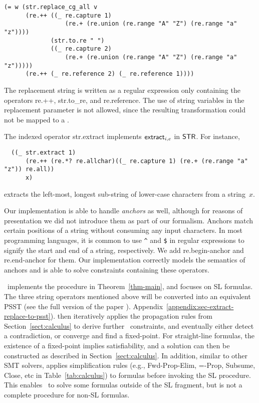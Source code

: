 {\small
\begin{verbatim}
(= w (str.replace_cg_all v
      (re.++ ((_ re.capture 1)
                 (re.+ (re.union (re.range "A" "Z") (re.range "a" "z"))))
             (str.to.re " ")
             ((_ re.capture 2)
                 (re.+ (re.union (re.range "A" "Z") (re.range "a" "z")))))
      (re.++ (_ re.reference 2) (_ re.reference 1))))
\end{verbatim}
}

The replacement string is written as a regular expression only
containing the operators {\sf re.++}, {\sf str.to\_re}, and {\sf
  re.reference}. The use of string variables in the replacement
parameter is not allowed, since the resulting transformation could
not be mapped to a \PSST.

The indexed operator {\sf str.extract} implements $\mathsf{extract}_{i, e}$ in
$\mathsf{STR}$. For instance,

{\small
\begin{verbatim}
  ((_ str.extract 1)
      (re.++ (re.*? re.allchar)((_ re.capture 1) (re.+ (re.range "a" "z")) re.all))
      x)
\end{verbatim}
}

\noindent
extracts the left-most, longest sub-string of lower-case
characters from a string~$x$.

Our implementation is able to handle \textit{anchors} as well,
although for reasons of presentation we did not introduce them as part
of our formalism. Anchors match certain
positions of a string without consuming any input characters. In most
programming languages, it is common to use \verb!^!
and
\verb!$! in regular expressions to signify the start and end of a
string, respectively. We add \textsf{re.begin-anchor} and
\textsf{re.end-anchor} for them. Our implementation correctly models
the semantics of anchors and is able to solve constraints containing
these operators.

\ostrich\ implements the procedure in Theorem~\ref{thm-main}, and
focuses on SL formulas. The three string operators mentioned above
will be converted into an equivalent PSST (see \ifproceeding the full
version of the paper \cite{popl22-full}).  \else
Appendix~\ref{appendix:sec-extract-replace-to-psst}). \fi {\ostrich}
then iteratively applies the propagation rules from
Section~\ref{sect:calculus} to derive further \regexp\ constraints,
and eventually either detect a contradiction, or converge and find a
fixed-point. For straight-line formulas, the existence of a
fixed-point implies satisfiability, and a solution can then be
constructed as described in Section~\ref{sect:calculus}.  In addition,
similar to other SMT solvers, {\ostrich} applies simplification rules
(e.g., {\sf Fwd-Prop-Elim, =-Prop, Subsume, Close}, etc in
Table~\ref{tab:calculus}) to formulas before invoking the SL
procedure.  This enables \ostrich\ to solve some formulas outside of the SL
fragment, but is not a complete procedure for non-SL formulas.

